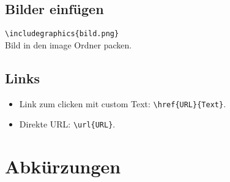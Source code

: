 \documentclass[conference,compsoc,final,a4paper, onecolumn, 11pt]{IEEEtran}
\begin{document}
\subsection{Bilder einfügen}
\texttt{\textbackslash includegraphics\{bild.png\}} \\
Bild in den image Ordner packen.

\subsection{Links}
\begin{itemize}
    \item Link zum clicken mit custom Text: \texttt{\textbackslash href\{URL\}\{Text\}}.
    \item Direkte URL: \texttt{\textbackslash url\{URL\}}.
\end{itemize}


\section*{Abkürzungen}

\begin{acronym}[IEEE]
\end{acronym}

\printbibliography
\end{document}
